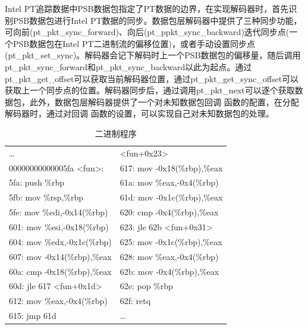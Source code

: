 Intel PT追踪数据中PSB数据包指定了PT数据的边界，在实现解码器时，首先识别PSB数据包进行Intel PT数据的同步。数据包层解码器中提供了三种同步功能，可向前(pt\_pkt\_sync\_forward)、向后(pt\_ppkt\_sync\_backward)迭代同步点(一个PSB数据包在Intel PT二进制流的偏移位置)，或者手动设置同步点(pt\_pkt\_set\_sync)。解码器会记下解码时上一个PSB数据包的偏移量，随后调用pt\_pkt\_sync\_forward和pt\_pkt\_sync\_backward以此为起点。通过pt\_pkt\_get\_offset可以获取当前解码器位置，通过pt\_pkt\_get\_sync\_offset可以获取上一个同步点的位置。解码器同步后，通过调用pt\_pkt\_next可以逐个获取数据包，此外，数据包层解码器提供了一个对未知数据包回调 函数的配置，在分配解码器时，通过对回调 函数的设置，可以实现自己对未知数据包的处理。
\begin{table}[]
	\centering
  	\caption{二进制程序}
  	\label{tab:3}
	\begin{tabular}{|l|l|}
	\hline
	\dots                                             & \textless{}fun+0x23\textgreater{}                    \\
	00000000000005fa \textless{}fun\textgreater{}:       & 617:    mov    -0x18(\%rbp),\%eax                    \\
	5fa:    push    \%rbp                                & 61a:    mov    \%eax,-0x4(\%rbp)                     \\
	5fb:    mov    \%rsp,\%rbp                           & 61d:    mov    -0x1c(\%rbp),\%eax                    \\
	5fe:    mov    \%edi,-0x14(\%rbp)                    & 620:    cmp    -0x4(\%rbp),\%eax                     \\
	601:    mov    \%esi,-0x18(\%rbp)                    & 623:    jle    62b \textless{}fun+0x31\textgreater{} \\
	604:    mov    \%edx,-0x1c(\%rbp)                    & 625:    mov    -0x1c(\%rbp),\%eax                    \\
	607:    mov    -0x14(\%rbp),\%eax                    & 628:    mov    \%eax,-0x4(\%rbp)                     \\
	60a:    cmp    -0x18(\%rbp),\%eax                    & 62b:    mov    -0x4(\%rbp),\%eax                     \\
	60d:    jle    617 \textless{}fun+0x1d\textgreater{} & 62e:    pop    \%rbp                                 \\
	612:    mov    \%eax,-0x4(\%rbp)                     & 62f:    retq                                         \\
	615:    jmp    61d                                   & \dots                                                 \\ \hline
	\end{tabular}
	\end{table} 
 

